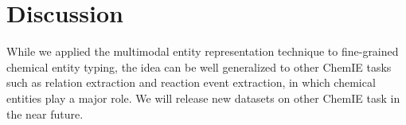 \section{Discussion}

While we applied the multimodal entity representation technique to fine-grained chemical entity typing, the idea can be well generalized to other ChemIE tasks such as relation extraction and reaction event extraction, in which chemical entities play a major role. We will release new datasets on other ChemIE task in the near future.